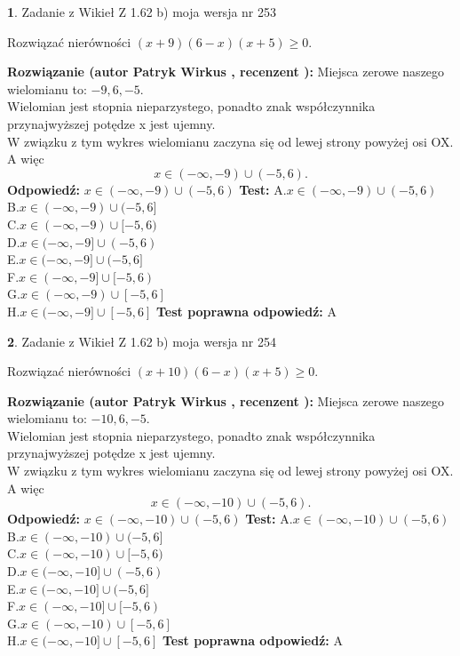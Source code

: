 \documentclass[12pt, a4paper]{article}
\theoremstyle{definition} %
\newtheorem{zad}{}
\newcommand{\zadStart}[1]{\begin{zad}#1\newline}
\newcommand{\zadStop}{\end{zad}}
\newcommand{\rozwStart}[2]{\noindent \textbf{Rozwiązanie (autor #1 , recenzent #2): }\newline}
\newcommand{\rozwStop}{\newline}
\newcommand{\odpStart}{\noindent \textbf{Odpowiedź:}\newline}
\newcommand{\odpStop}{\newline}
\newcommand{\testStart}{\noindent \textbf{Test:}\newline}
\newcommand{\testStop}{\newline}
\newcommand{\kluczStart}{\noindent \textbf{Test poprawna odpowiedź:}\newline}
\newcommand{\kluczStop}{\newline}
\begin{document}
\zadStart{Zadanie z Wikieł Z 1.62 b) moja wersja nr 253}

Rozwiązać nierówności $(x+9)(6-x)(x+5)\ge0$.
\zadStop
\rozwStart{Patryk Wirkus}{}
Miejsca zerowe naszego wielomianu to: $-9, 6, -5$.\\
Wielomian jest stopnia nieparzystego, ponadto znak współczynnika przy\linebreak najwyższej potędze x jest ujemny.\\ W związku z tym wykres wielomianu zaczyna się od lewej strony powyżej osi OX. A więc $$x \in (-\infty,-9) \cup (-5,6).$$
\rozwStop
\odpStart
$x \in (-\infty,-9) \cup (-5,6)$
\odpStop
\testStart
A.$x \in (-\infty,-9) \cup (-5,6)$\\
B.$x \in (-\infty,-9) \cup (-5,6]$\\
C.$x \in (-\infty,-9) \cup [-5,6)$\\
D.$x \in (-\infty,-9] \cup (-5,6)$\\
E.$x \in (-\infty,-9] \cup (-5,6]$\\
F.$x \in (-\infty,-9] \cup [-5,6)$\\
G.$x \in (-\infty,-9) \cup [-5,6]$\\
H.$x \in (-\infty,-9] \cup [-5,6]$
\testStop
\kluczStart
A
\kluczStop



\zadStart{Zadanie z Wikieł Z 1.62 b) moja wersja nr 254}

Rozwiązać nierówności $(x+10)(6-x)(x+5)\ge0$.
\zadStop
\rozwStart{Patryk Wirkus}{}
Miejsca zerowe naszego wielomianu to: $-10, 6, -5$.\\
Wielomian jest stopnia nieparzystego, ponadto znak współczynnika przy\linebreak najwyższej potędze x jest ujemny.\\ W związku z tym wykres wielomianu zaczyna się od lewej strony powyżej osi OX. A więc $$x \in (-\infty,-10) \cup (-5,6).$$
\rozwStop
\odpStart
$x \in (-\infty,-10) \cup (-5,6)$
\odpStop
\testStart
A.$x \in (-\infty,-10) \cup (-5,6)$\\
B.$x \in (-\infty,-10) \cup (-5,6]$\\
C.$x \in (-\infty,-10) \cup [-5,6)$\\
D.$x \in (-\infty,-10] \cup (-5,6)$\\
E.$x \in (-\infty,-10] \cup (-5,6]$\\
F.$x \in (-\infty,-10] \cup [-5,6)$\\
G.$x \in (-\infty,-10) \cup [-5,6]$\\
H.$x \in (-\infty,-10] \cup [-5,6]$
\testStop
\kluczStart
A
\kluczStop
\end{document}
